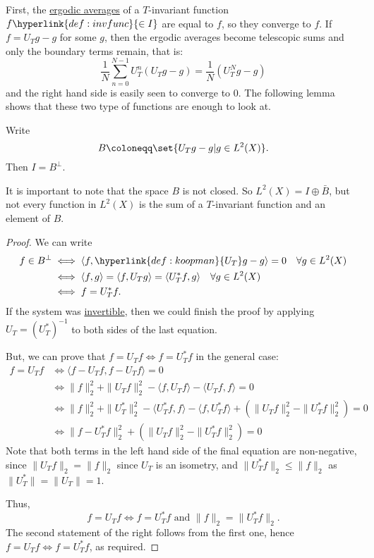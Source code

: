 \documentclass{article}
\begin{document}
First, the \hyperlink{def:ergavg}{ergodic averages} of a $T$-invariant function $f \hyperlink{def:invfunc}{\in I}$ are equal to $f$, so they converge to $f$.
If $f = U_T g - g$ for some $g$, then the ergodic averages become telescopic sums and only the boundary terms remain, that is:
\begin{equation*}
  \frac{1}{N} \sum_{n=0}^{N-1} U_T^n(U_T g - g) = \frac{1}{N} (U_T^N g - g)
\end{equation*}
and the right hand side is easily seen to converge to $0$.
The following lemma shows that these two type of functions are enough to look at.
\begin{lemma}
  Write
  \begin{equation*}
    B \coloneqq \set{U_T g - g | g \in L^2(X)}.
  \end{equation*}
  Then $I = B^\perp$.
\end{lemma}
It is important to note that the space $B$ is not closed. So $L^2(X) = I \oplus \bar{B}$, but not every function in $L^2(X)$ is the sum of a $T$-invariant function and an element of $B$.
\begin{proof}
  We can write
  \begin{align*}
    f \in B^\perp &\iff \langle f, \hyperlink{def:koopman}{U_T} g - g \rangle = 0 \quad \forall g \in L^2(X) \\
                  &\iff \langle f, g \rangle = \langle f, U_T g \rangle = \langle U_T^* f, g \rangle \quad \forall g \in L^2(X) \\
                  &\iff f = U_T^* f.
  \end{align*}
  If the system was \hyperlink{def:inv}{invertible}, then we could finish the proof by applying $U_T = (U_T^*)^{-1}$ to both sides of the last equation.

  But, we can prove that $f = U_T f \iff f = U_T^* f$ in the general case:
  \begin{align*}
    f = U_T f &\iff \langle f - U_T f, f - U_T f \rangle = 0 \\
              &\iff\|f\|_2^2+\|U_T f\|^2_2-\langle f,U_Tf\rangle-\langle U_Tf,f\rangle=0 \\
              &\iff\|f\|_2^2+\|U_T^*\|_2^2-\langle U_T^*f,f\rangle-\langle f,U_T^*f\rangle + (\|U_Tf\|^2_2-\|U_T^*f\|_2^2) = 0 \\
              &\iff\|f-U_T^*f\|_2^2+(\|U_Tf\|_2^2-\|U_T^*f\|_2^2)=0
  \end{align*}
  Note that both terms in the left hand side of the final equation are non-negative, since $\|U_Tf\|_2=\|f\|_2$ since $U_T$ is an isometry, and $\|U_T^*f\|_2\leq\|f\|_2$ as $\|U_T^*\|=\|U_T\|=1$.

  Thus,
  \begin{equation*}
    f = U_T f \iff f = U_T^* f\text{ and }\|f\|_2 = \|U_T^*f\|_2.
  \end{equation*}
  The second statement of the right follows from the first one, hence $f = U_T f \iff f = U_T^*f$, as required.
\end{proof}
\end{document}

